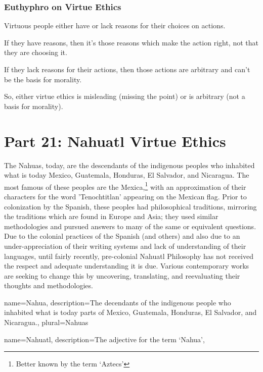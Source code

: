 \subsection{Euthyphro on Virtue Ethics}
\begin{earg}
    \item[1] Virtuous people either have or lack reasons for their choices on actions.
    \item[2] If they have reasons, then it’s those reasons which make the action right, not that they are choosing it.
    \item[3] If they lack reasons for their actions, then those actions are arbitrary and can’t be the basis for morality.
    \item[4] So, either virtue ethics is misleading (missing the point) or is arbitrary (not a basis for morality).
\end{earg}

\chapter{Part 21: Nahuatl Virtue Ethics}

The \glspl{Nahua}, today, are the descendants of the indigenous peoples who inhabited what is today Mexico, Guatemala, Honduras, El Salvador, and Nicaragua. The most famous of these peoples are the Mexica,\footnote{Better known by the term `Aztecs'} with an approximation of their characters for the word 'Tenochtitlan' appearing on the Mexican flag. Prior to colonization by the Spanish, these peoples had philosophical traditions, mirroring the traditions which are found in Europe and Asia; they used similar methodologies and pursued answers to many of the same or equivalent questions. Due to the colonial practices of the Spanish (and others) and also due to an under-appreciation of their writing systems and lack of understanding of their languages, until fairly recently, pre-colonial \gls{Nahuatl} Philosophy has not received the respect and adequate understanding it is due. Various contemporary works are seeking to change this by uncovering, translating, and reevaluating their thoughts and methodologies. 

{
  name=Nahua,
  description={The decendants of the indigenous people who inhabited what is today parts of Mexico, Guatemala, Honduras, El Salvador, and Nicaragua.},
  plural=Nahuas
}

{
  name=Nahuatl,
  description={The adjective for the term `Nahua'},
}


